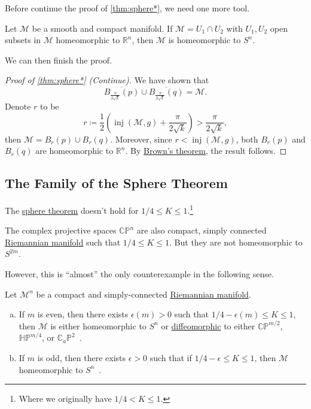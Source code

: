 Before continue the proof of \autoref{thm:sphere*}, we need one more tool.

\begin{theorem}\label{thm:Brown}
	Let \(\mathcal{M} \) be a smooth and compact manifold. If \(\mathcal{M} = U_1 \cap U_2\) with \(U_1, U_2\) open subsets in \(\mathcal{M} \) homeomorphic to \(\mathbb{R} ^n\), then \(\mathcal{M} \) is homeomorphic to \(S^n\).
\end{theorem}

We can then finish the proof.

\begin{proof}[Proof of \autoref{thm:sphere*} (Continue)]
	We have shown that
	\[
		\overline{B_{\frac{\pi}{2\sqrt{k} }}(p)} \cup \overline{B_{\frac{\pi}{2 \sqrt{k} }}(q)} = \mathcal{M}.
	\]
	Denote \(r\) to be
	\[
		r \coloneqq \frac{1}{2} \left( \mathop{\mathrm{inj}}(\mathcal{M} , g) + \frac{\pi}{2 \sqrt{k} } \right) > \frac{\pi}{2 \sqrt{k}} ,
	\]
	then \(\mathcal{M} = B_r(p) \cup B_r(q)\). Moreover, since \(r < \mathop{\mathrm{inj}}(\mathcal{M} , g) \), both \(B_r(p)\) and \(B_r(q)\) are homeomorphic to \(\mathbb{R} ^n\). By \hyperref[thm:Brown]{Brown's theorem}, the result follows.
\end{proof}

\subsection{The Family of the Sphere Theorem}
The \hyperref[thm:sphere*]{sphere theorem} doesn't hold for \(1 / 4 \leq K \leq 1\).\footnote{Where we originally have \(1 / 4 < K \leq 1\).}

\begin{eg}
	The complex projective spaces \(\mathbb{C} \mathbb{P} ^n\) are also compact, simply connected \hyperref[def:Riemannian-manifold]{Riemannian manifold} such that \(1 / 4 \leq K \leq 1\). But they are not homeomorphic to \(S^{2m} \).
\end{eg}

However, this is ``almost'' the only counterexample in the following sense.

\begin{theorem}
	Let \(\mathcal{M} ^n\) be a compact and simply-connected \hyperref[def:Riemannian-manifold]{Riemannian manifold}.
	\begin{enumerate}[(a)]
		\item If \(m\) is even, then there exists \(\epsilon (m) > 0\) such that \(1 / 4 - \epsilon (m) \leq K \leq 1\), then \(\mathcal{M} \) is either homeomorphic to \(S^n\) or \hyperref[def:diffeomorphic]{diffeomorphic} to either \(\mathbb{C} \mathbb{P} ^{m / 2}\), \(\mathbb{H} \mathbb{P} ^{m / 4}\), or \(\mathbb{C} _a \mathbb{P} ^2\)~\cite{AIF_1983__33_2_135_0}.
		\item If \(m\) is odd, then there exists \(\epsilon > 0\) such that if \(1 / 4 - \epsilon \leq K \leq 1\), then \(\mathcal{M} \) homeomorphic to \(S^n\)~\cite{Abresch1996AST}.
	\end{enumerate}
\end{theorem}

